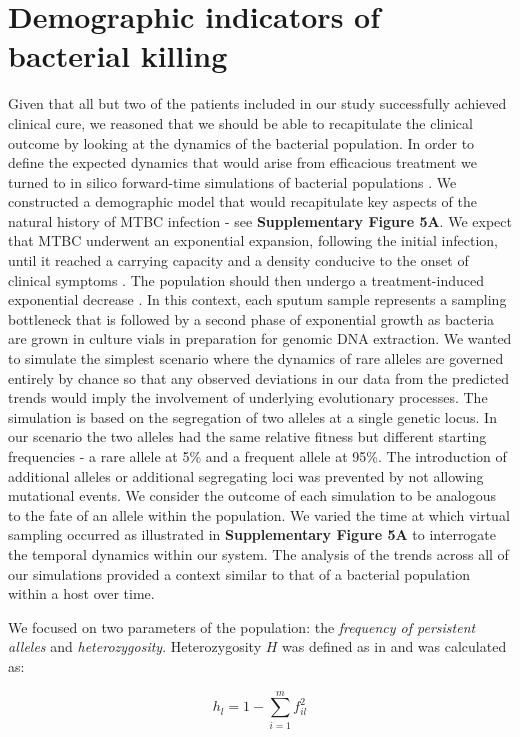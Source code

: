 \documentclass[12pt, oneside]{article}   	%
\begin{document}
\section{Demographic indicators of bacterial killing}
Given that all but two of the patients included in our study successfully achieved clinical cure, we reasoned that we should be able to recapitulate the clinical outcome by looking at the dynamics of the bacterial population. In order to define the expected dynamics that would arise from efficacious treatment we turned to in silico forward-time simulations of bacterial populations \cite{simuPOP}. We constructed a demographic model that would recapitulate key aspects of the natural history of MTBC infection - see \textbf{Supplementary Figure 5A}. We expect that MTBC underwent an exponential expansion, following the initial infection, until it reached a carrying capacity and a density conducive to the onset of clinical symptoms \cite{Lawn2010}. The population should then undergo a treatment-induced exponential decrease \cite{EBA}. In this context, each sputum sample represents a sampling bottleneck that is followed by a second phase of exponential growth as bacteria are grown in culture vials in preparation for genomic DNA extraction.
We wanted to simulate the simplest scenario where the dynamics of rare alleles are governed entirely by chance so that any observed deviations in our data from the predicted trends would imply the involvement of underlying evolutionary processes. The simulation is based on the segregation of two alleles at a single genetic locus. In our scenario the two alleles had the same relative fitness but different starting frequencies - a rare allele at 5\% and a frequent allele at 95\%. The introduction of additional alleles or additional segregating loci was prevented by not allowing mutational events. We consider the outcome of each simulation to be analogous to the fate of an allele within the population. We varied the time at which virtual sampling occurred as illustrated in \textbf{Supplementary Figure 5A} to interrogate the temporal dynamics within our system. The analysis of the trends across all of our simulations provided a context similar to that of a bacterial population within a host over time.

We focused on two parameters of the population: the \emph{frequency of persistent alleles} and \emph{heterozygosity}. Heterozygosity $H$ was defined as in \cite{Cuevas2015} and was calculated as:

\begin{equation} \label{eq:locus}
h_l = 1-\sum^m_{i=1}f^2_{il}
\end{equation}
\end{document}
